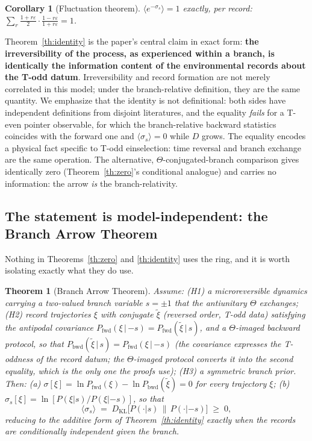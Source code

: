 \documentclass[11pt]{article}
\newtheorem{theorem}{Theorem}
\newtheorem{corollary}{Corollary}
\begin{document}
\begin{corollary}[Fluctuation theorem]
$\langle e^{-\sigma_s}\rangle = 1$ exactly, per record:
$\sum_r \frac{1+r\varepsilon}{2}\cdot\frac{1-r\varepsilon}{1+r\varepsilon} = 1$.
\end{corollary}

Theorem~\ref{th:identity} is the paper's central claim in exact form: \textbf{the irreversibility of the process, as experienced within a branch, is identically the information content of the environmental records about the T-odd datum}. Irreversibility and record formation are not merely correlated in this model; under the branch-relative definition, they are the same quantity. We emphasize that the identity is not definitional: both sides have independent definitions from disjoint literatures, and the equality \emph{fails} for a T-even pointer observable, for which the branch-relative backward statistics coincides with the forward one and $\langle\sigma_s\rangle=0$ while $D$ grows. The equality encodes a physical fact specific to T-odd einselection: time reversal and branch exchange are the same operation. The alternative, $\Theta$-conjugated-branch comparison gives identically zero (Theorem~\ref{th:zero}'s conditional analogue) and carries no information: the arrow \emph{is} the branch-relativity.



\subsection{The statement is model-independent: the Branch Arrow Theorem}
\label{sec:BAT}

Nothing in Theorems~\ref{th:zero} and \ref{th:identity} uses the ring, and it is worth isolating exactly what they do use.

\begin{theorem}[Branch Arrow Theorem]\label{th:BAT}
Assume: (H1) a microreversible dynamics carrying a two-valued branch variable $s = \pm 1$ that the antiunitary $\Theta$ exchanges; (H2) record trajectories $\xi$ with conjugate $\tilde\xi$ (reversed order, T-odd data) satisfying the antipodal covariance $P_{\mathrm{fwd}}(\xi\,|\,{-s}) = P_{\mathrm{fwd}}(\tilde\xi\,|\,s)$, and a $\Theta$-imaged backward protocol, so that $P_{\mathrm{bwd}}(\tilde\xi\,|\,s) = P_{\mathrm{fwd}}(\xi\,|\,{-s})$ (the covariance expresses the T-oddness of the record datum; the $\Theta$-imaged protocol converts it into the second equality, which is the only one the proofs use); (H3) a symmetric branch prior. Then: (a) $\sigma[\xi] = \ln P_{\mathrm{fwd}}(\xi) - \ln P_{\mathrm{bwd}}(\tilde\xi) = 0$ for every trajectory $\xi$; (b) $\sigma_s[\xi] = \ln[P(\xi|s)/P(\xi|{-s})]$, so that
\[ \langle\sigma_s\rangle \;=\; D_{\mathrm{KL}}\big[P(\cdot|s)\,\big\|\,P(\cdot|{-s})\big] \;\ge\; 0, \]
reducing to the additive form of Theorem~\ref{th:identity} exactly when the records are conditionally independent given the branch.
\end{theorem}
\end{document}
